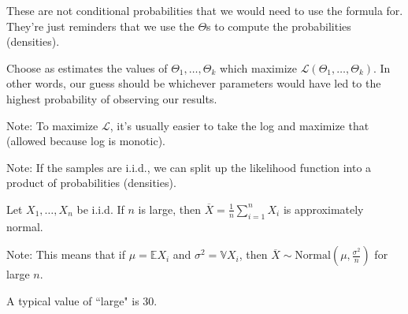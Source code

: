 \documentclass{article}
\begin{document}
    These are not conditional probabilities that we would need to use the formula for. They're just reminders that we use the $\Theta$s to compute the probabilities (densities).

\medskip
{}

    Choose as estimates the values of $\Theta_1, \hdots, \Theta_k$ which maximize $\mathcal L(\Theta_1, \hdots, \Theta_k)$. In other words, our guess should be whichever parameters would have led to the highest probability of observing our results.

    Note: To maximize $\mathcal L$, it's usually easier to take the log and maximize that (allowed because log is monotic).

    Note: If the samples are i.i.d., we can split up the likelihood function into a product of probabilities (densities).

\medskip
{}

    Let $X_1, \hdots, X_n$ be i.i.d. If $n$ is large, then $\overline X = \frac1n\sum\limits_{i=1}^nX_i$ is approximately normal.

    Note: This means that if $\mu = \mathbb EX_i$ and $\sigma^2 = \mathbb VX_i$, then $\overline X \sim \text{Normal}(\mu, \frac{\sigma^2}n)$ for large $n$.

    A typical value of ``large" is 30.
\end{document}
